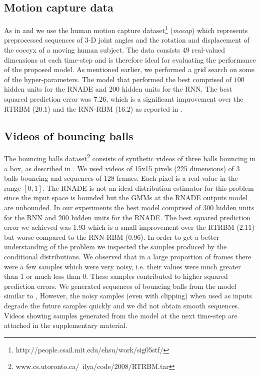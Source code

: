 \documentclass{article} %
\begin{document}
\subsection{Motion capture data}
As in \cite{Sutskever2008} and \cite{Boulanger-Lewandowski2012} we use the human motion capture dataset\footnote{http://people.csail.mit.edu/ehsu/work/sig05stf/} ({\it mocap}) which represents preprocessed sequences of 3-D joint angles and the rotation and displacement of the coccyx of a moving human subject. The data consists 49 real-valued dimensions at each time-step and is therefore ideal for evaluating the performance of the proposed model. As mentioned earlier, we performed a grid search on some of the hyper-parameters. The model that performed the best comprised of $100$ hidden units for the RNADE and $200$ hidden units for the RNN. The best squared prediction error was $\mathbf{7.26}$, which is a significant improvement over the RTRBM ($20.1$) and the RNN-RBM ($16.2$) as reported in \cite{Boulanger-Lewandowski2012}. 

\subsection{Videos of bouncing balls}
The bouncing balls dataset\footnote{www.cs.utoronto.ca/~ilya/code/2008/RTRBM.tar} consists of synthetic videos of three balls bouncing in a box, as described in \cite{Sutskever2008}. We used videos of 15x15 pixels (225 dimensions) of 3 balls bouncing and sequences of 128 frames. Each pixel is a real value in the range $[0,1]$. The RNADE is not an ideal distribution estimator for this problem since the input space is bounded but the GMMs at the RNADE outputs model are unbounded. In our experiments the best model comprised of $300$ hidden units for the RNN and $200$ hidden units for the RNADE. The best squared prediction error we achieved was $1.93$ which is a small improvement over the RTRBM ($2.11$) but worse compared to the RNN-RBM ($0.96$). In order to get a better understanding of the problem we inspected the samples produced by the conditional distributions. We observed that in a large proportion of frames there were a few samples which were very noisy, i.e. their values were much greater than 1 or much less than 0. These samples contributed to higher squared prediction errors. We generated sequences of bouncing balls from the model similar to \cite{Sutskever2008}, However, the noisy samples (even with clipping) when used as inputs degrade the future samples quickly and we did not obtain smooth sequences. Videos showing samples generated from the model at the next time-step are attached in the supplementary material.
\end{document}
